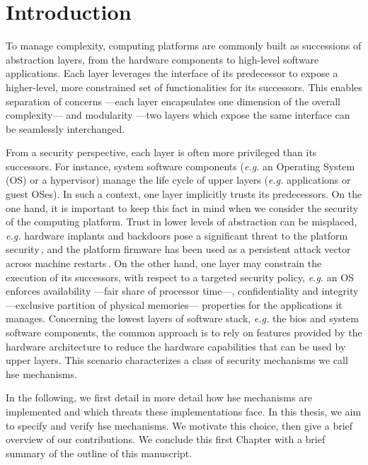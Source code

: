 \chapter{Introduction}
\label{chapter:introduction}


\vspace{1cm}\noindent
%
To manage complexity, computing platforms are commonly built as successions of
abstraction layers, from the hardware components to high-level software
applications.
%
Each layer leverages the interface of its predecessor to expose a higher-level,
more constrained set of functionalities for its successors.
%
This enables separation of concerns ---each layer encapsulates one dimension of
the overall complexity--- and modularity ---two layers which expose the same
interface can be seamlessly interchanged.

From a security perspective, each layer is often more privileged than its
successors.
%
For instance, system software components (\emph{e.g.} an Operating System (OS)
or a hypervisor) manage the life cycle of upper layers (\emph{e.g.} applications
or guest OSes).
%
In such a context, one layer implicitly trusts its predecessors.
%
On the one hand, it is important to keep this fact in mind when we consider the
security of the computing platform.
%
Trust in lower levels of abstraction can be misplaced, \emph{e.g.} hardware
implants and backdoors pose a significant threat to the platform
security\,\cite{yang2016a2}, and the platform firmware has been used as a
persistent attack vector across machine restarts\,\cite{embleton2013smm}.
%
On the other hand, one layer may constrain the execution of its successors, with
respect to a targeted security policy, \emph{e.g.}  an OS enforces availability
---fair share of processor time---, confidentiality and integrity ---exclusive
partition of physical memories--- properties for the applications it manages.
%
Concerning the lowest layers of software stack, \emph{e.g.} the \ac{bios} and
system software components, the common approach is to rely on features provided
by the hardware architecture to reduce the hardware capabilities that can be
used by upper layers.
%
This scenario characterizes a class of security mechanisms we call \ac{hse}
mechanisms.

In the following, we first detail in more detail how \ac{hse} mechanisms are
implemented and which threats these implementations face.
%
In this thesis, we aim to specify and verify \ac{hse} mechanisms.
%
We motivate this choice, then give a brief overview of our contributions.
%
We conclude this first Chapter with a brief summary of the outline of this
manuscript.

